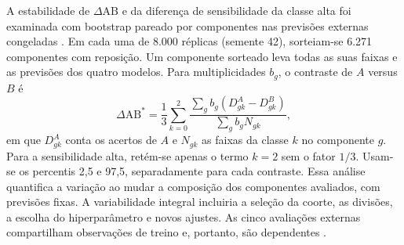 A estabilidade de $\Delta\mathrm{AB}$ e da diferença de sensibilidade da classe alta foi examinada com bootstrap pareado por componentes nas previsões externas congeladas \cite{field2007}. Em cada uma de 8.000 réplicas (semente 42), sorteiam-se 6.271 componentes com reposição. Um componente sorteado leva todas as suas faixas e as previsões dos quatro modelos. Para multiplicidades $b_g$, o contraste de $A$ versus $B$ é
\begin{equation}
\Delta\mathrm{AB}^{*}=\frac13\sum_{k=0}^2
\frac{\sum_g b_g (D^A_{gk}-D^B_{gk})}{\sum_g b_g N_{gk}},
\end{equation}
em que $D^A_{gk}$ conta os acertos de $A$ e $N_{gk}$ as faixas da classe $k$ no componente $g$. Para a sensibilidade alta, retém-se apenas o termo $k=2$ sem o fator $1/3$. Usam-se os percentis 2,5 e 97,5, separadamente para cada contraste. Essa análise quantifica a variação ao mudar a composição dos componentes avaliados, com previsões fixas. A variabilidade integral incluiria a seleção da coorte, as divisões, a escolha do hiperparâmetro e novos ajustes. As cinco avaliações externas compartilham observações de treino e, portanto, são dependentes \cite{bengio2004,bates2024}.

